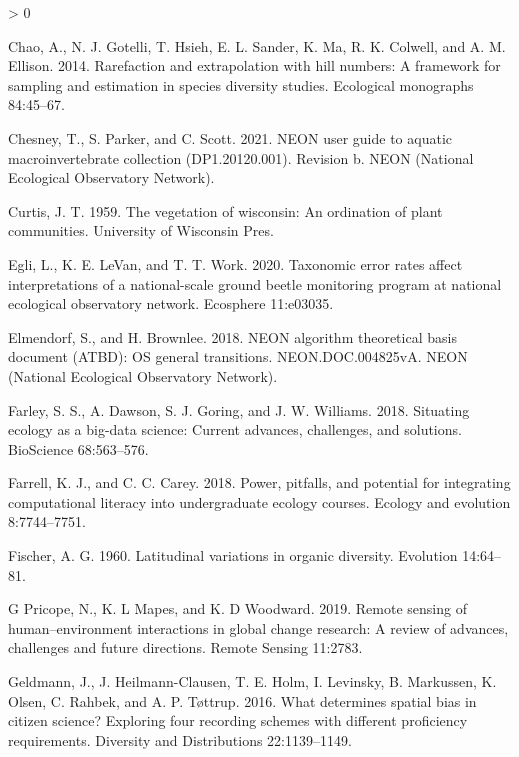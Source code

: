 \documentclass[
  12pt,
]{article}
\newlength{\cslhangindent}
\newenvironment{CSLReferences}[2] %
 {%
  \setlength{\parindent}{0pt}
  \ifodd #1 \everypar{\setlength{\hangindent}{\cslhangindent}}\ignorespaces\fi
  \ifnum #2 > 0
  \setlength{\parskip}{#2\baselineskip}
  \fi
 }%
 {}
\begin{document}
\begin{CSLReferences}{1}{0}
\leavevmode\hypertarget{ref-chao2014rarefaction}{}%
Chao, A., N. J. Gotelli, T. Hsieh, E. L. Sander, K. Ma, R. K. Colwell, and A. M. Ellison. 2014. Rarefaction and extrapolation with hill numbers: A framework for sampling and estimation in species diversity studies. Ecological monographs 84:45--67.

\leavevmode\hypertarget{ref-Chesney2021}{}%
Chesney, T., S. Parker, and C. Scott. 2021. NEON user guide to aquatic macroinvertebrate collection (DP1.20120.001). Revision b. NEON (National Ecological Observatory Network).

\leavevmode\hypertarget{ref-curtis1959vegetation}{}%
Curtis, J. T. 1959. The vegetation of wisconsin: An ordination of plant communities. University of Wisconsin Pres.

\leavevmode\hypertarget{ref-egli2020taxonomic}{}%
Egli, L., K. E. LeVan, and T. T. Work. 2020. Taxonomic error rates affect interpretations of a national-scale ground beetle monitoring program at national ecological observatory network. Ecosphere 11:e03035.

\leavevmode\hypertarget{ref-Elmendorf2018}{}%
Elmendorf, S., and H. Brownlee. 2018. NEON algorithm theoretical basis document (ATBD): OS general transitions. NEON.DOC.004825vA. NEON (National Ecological Observatory Network).

\leavevmode\hypertarget{ref-farley2018situating}{}%
Farley, S. S., A. Dawson, S. J. Goring, and J. W. Williams. 2018. Situating ecology as a big-data science: Current advances, challenges, and solutions. BioScience 68:563--576.

\leavevmode\hypertarget{ref-farrell2018power}{}%
Farrell, K. J., and C. C. Carey. 2018. Power, pitfalls, and potential for integrating computational literacy into undergraduate ecology courses. Ecology and evolution 8:7744--7751.

\leavevmode\hypertarget{ref-fischer1960latitudinal}{}%
Fischer, A. G. 1960. Latitudinal variations in organic diversity. Evolution 14:64--81.

\leavevmode\hypertarget{ref-g2019remote}{}%
G Pricope, N., K. L Mapes, and K. D Woodward. 2019. Remote sensing of human--environment interactions in global change research: A review of advances, challenges and future directions. Remote Sensing 11:2783.

\leavevmode\hypertarget{ref-geldmann2016determines}{}%
Geldmann, J., J. Heilmann-Clausen, T. E. Holm, I. Levinsky, B. Markussen, K. Olsen, C. Rahbek, and A. P. Tøttrup. 2016. What determines spatial bias in citizen science? Exploring four recording schemes with different proficiency requirements. Diversity and Distributions 22:1139--1149.


\end{CSLReferences}
\end{document}
